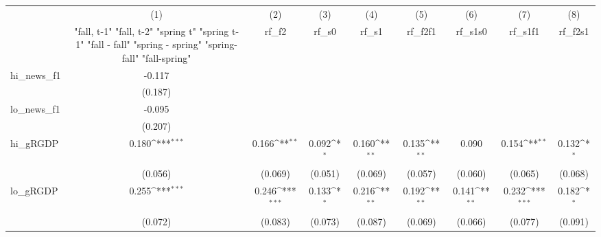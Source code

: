 {
\def\sym#1{\ifmmode^{#1}\else\(^{#1}\)\fi}
\begin{tabular}{l*{8}{c}}
\toprule
            &\multicolumn{1}{c}{(1)}&\multicolumn{1}{c}{(2)}&\multicolumn{1}{c}{(3)}&\multicolumn{1}{c}{(4)}&\multicolumn{1}{c}{(5)}&\multicolumn{1}{c}{(6)}&\multicolumn{1}{c}{(7)}&\multicolumn{1}{c}{(8)}\\
            &\multicolumn{1}{c}{  "fall, t-1" "fall, t-2" "spring t" "spring t-1"  "fall - fall" "spring - spring" "spring-fall" "fall-spring" }&\multicolumn{1}{c}{rf\_f2}&\multicolumn{1}{c}{rf\_s0}&\multicolumn{1}{c}{rf\_s1}&\multicolumn{1}{c}{rf\_f2f1}&\multicolumn{1}{c}{rf\_s1s0}&\multicolumn{1}{c}{rf\_s1f1}&\multicolumn{1}{c}{rf\_f2s1}\\
\midrule
hi\_news\_f1  &      -0.117         &                     &                     &                     &                     &                     &                     &                     \\
            &     (0.187)         &                     &                     &                     &                     &                     &                     &                     \\
\addlinespace
lo\_news\_f1  &      -0.095         &                     &                     &                     &                     &                     &                     &                     \\
            &     (0.207)         &                     &                     &                     &                     &                     &                     &                     \\
\addlinespace
hi\_gRGDP    &       0.180\sym{***}&       0.166\sym{**} &       0.092\sym{*}  &       0.160\sym{**} &       0.135\sym{**} &       0.090         &       0.154\sym{**} &       0.132\sym{*}  \\
            &     (0.056)         &     (0.069)         &     (0.051)         &     (0.069)         &     (0.057)         &     (0.060)         &     (0.065)         &     (0.068)         \\
\addlinespace
lo\_gRGDP    &       0.255\sym{***}&       0.246\sym{***}&       0.133\sym{*}  &       0.216\sym{**} &       0.192\sym{**} &       0.141\sym{**} &       0.232\sym{***}&       0.182\sym{*}  \\
            &     (0.072)         &     (0.083)         &     (0.073)         &     (0.087)         &     (0.069)         &     (0.066)         &     (0.077)         &     (0.091)         \\

\end{tabular}}
